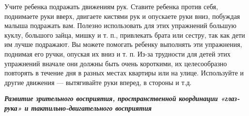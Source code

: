 \documentclass{book}
\renewcommand{\emph}[1]{\textit{#1}}
\begin{document}
\begin{enumerate}
  Учите ребенка подражать движениям рук. Ставите ребенка против себя,
  поднимаете руки вверх, двигаете кистями рук и опускаете руки вниз,
  побуждая малыша подражать вам. Полезно использовать для этих
  упражнений большую куклу, большого зайца, мишку и т. п., привлекать
  брата или сестру, так как дети им лучше подражают. Вы можете помогать
  ребенку выполнять эти упражнения, поднимая его ручки, опуская их вниз
  и т. п. Из-за трудности для детей этих упражнений вначале они должны
  быть очень короткими, их целесообразно повторять в течение дня в
  разных местах квартиры или на улице. Используйте и другие движения ---
  вытягивайте руки вперед, в стороны и т.д.
  
\end{enumerate}


\emph{\textbf{Развитие зрительного восприятия, пространственной
координации «глаз-рука» и тактильно-двигательного восприятия}}
\end{document}
